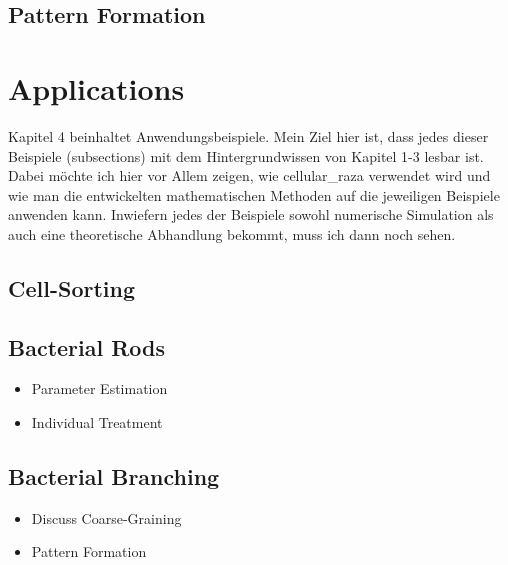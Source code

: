 \subsection{Pattern Formation}

\pagebreak
\section{Applications}

Kapitel 4 beinhaltet Anwendungsbeispiele. Mein Ziel hier ist, dass jedes dieser Beispiele
(subsections) mit dem Hintergrundwissen von Kapitel 1-3 lesbar ist. Dabei möchte ich hier
vor Allem zeigen, wie cellular\_raza verwendet wird und wie man die entwickelten
mathematischen Methoden auf die jeweiligen Beispiele anwenden kann. Inwiefern jedes der
Beispiele sowohl numerische Simulation als auch eine theoretische Abhandlung bekommt,
muss ich dann noch sehen.

\subsection{Cell-Sorting}
\subsection{Bacterial Rods}
\begin{itemize}
    \item Parameter Estimation
    \item Individual Treatment
\end{itemize}
\subsection{Bacterial Branching}
\begin{itemize}
    \item Discuss Coarse-Graining
    \item Pattern Formation
\end{itemize}

